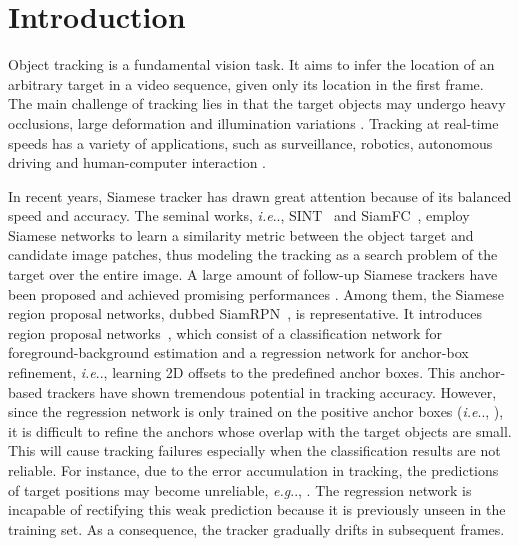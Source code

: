 \documentclass[runningheads]{llncs}
\makeatletter
\DeclareRobustCommand\onedot{\futurelet\@let@token\@onedot}
\def\@onedot{\ifx\@let@token.\else.\null\fi\xspace}
\def\eg{\emph{e.g}\onedot} \def\Eg{\emph{E.g}\onedot}
\def\ie{\emph{i.e}\onedot} \def\Ie{\emph{I.e}\onedot}
\makeatother
\begin{document}
\section{Introduction}
Object tracking is a fundamental vision task. It aims to infer the location of an arbitrary target in a video sequence, given only its location in the first frame. The main challenge of tracking lies in that the target objects may undergo heavy occlusions, large deformation and illumination variations \cite{OTB-2015,SURVEY2}. Tracking at real-time speeds has a variety of applications, such as surveillance, robotics, autonomous driving and human-computer interaction \cite{intro1,intro2,intro3}.



In recent years, Siamese tracker has drawn great attention because of its balanced speed and accuracy. The seminal works, \ie, SINT~\cite{SINT} and SiamFC~\cite{siamFC}, employ Siamese networks to learn a similarity metric between the object target and candidate image patches, thus modeling the tracking as a search problem of the target over the entire image.
A large amount of follow-up Siamese trackers have been proposed and achieved promising performances \cite{CRPN,DSiam,SiamRPN++,siamRPN,SiamDW}. Among them, the Siamese region proposal networks, dubbed SiamRPN~\cite{siamRPN}, is representative. 
It introduces region proposal networks~\cite{FasterRCNN}, which consist of a classification network for foreground-background estimation and a regression network for anchor-box refinement, \ie, learning 2D offsets to the predefined anchor boxes. This anchor-based trackers have shown tremendous potential in tracking accuracy. However, since the regression network is only trained on the positive anchor boxes (\ie, ), it is difficult to refine the anchors whose overlap with the target objects are small. This will cause tracking failures especially when the classification results are not reliable.
For instance, due to the error accumulation in tracking, the predictions of target positions may become unreliable, \eg, . The regression network is incapable of rectifying this weak prediction because it is previously unseen in the training set. As a consequence, the tracker gradually drifts in subsequent frames. 
\end{document}
